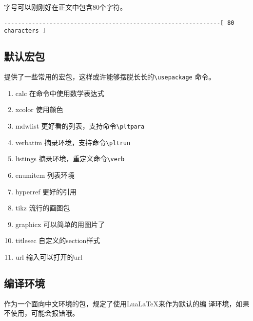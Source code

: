 \documentclass{peterlitsdoc}
\newcommand{\vb}{\verb}
\begin{document}
字号可以刚刚好在正文中包含80个字符。
\begin{lstlisting}
--------------------------------------------------------------[ 80 characters ]
\end{lstlisting}


\subsection{默认宏包}

提供了一些常用的宏包，这样或许能够摆脱长长的\vb|\usepackage|
命令。

\begin{enumerate}
    \item calc          \hfill 在命令中使用数学表达式
    \item xcolor        \hfill 使用颜色
    \item mdwlist
          \hfill 更好看的列表，支持命令\vb|\pltpara|
    \item verbatim      \hfill 摘录环境，支持命令\vb|\pltrun|
    \item listings      \hfill 摘录环境，重定义命令\verb|\verb|
    \item enumitem      \hfill 列表环境
    \item hyperref      \hfill 更好的引用
    \item tikz          \hfill 流行的画图包
    \item graphicx      \hfill 可以简单的用图片了
    \item titlesec      \hfill 自定义的section样式
    \item url           \hfill 输入可以打开的url
\end{enumerate}


\subsection{编译环境}

作为一个面向中文环境的包，规定了使用LuaLaTeX来作为默认的编
译环境，如果不使用，可能会报错哦。


\end{document}
